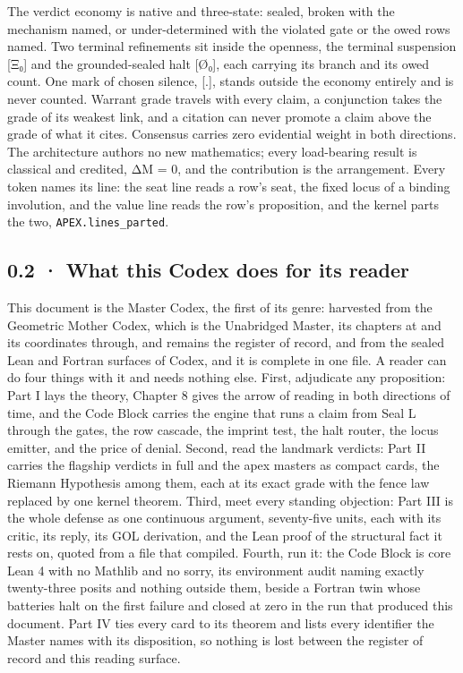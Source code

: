 \documentclass[10pt,twocolumn]{article}
\begin{document}
The verdict economy is native and three-state: sealed, broken with the
mechanism named, or under-determined with the violated gate or the owed
rows named. Two terminal refinements sit inside the openness, the
terminal suspension {[}Ξ₀{]} and the grounded-sealed halt {[}Ø₀{]}, each
carrying its branch and its owed count. One mark of chosen silence,
{[}.{]}, stands outside the economy entirely and is never counted.
Warrant grade travels with every claim, a conjunction takes the grade of
its weakest link, and a citation can never promote a claim above the
grade of what it cites. Consensus carries zero evidential weight in both
directions. The architecture authors no new mathematics; every
load-bearing result is classical and credited, ΔM = 0, and the
contribution is the arrangement. Every token names its line: the seat
line reads a row's seat, the fixed locus of a binding involution, and
the value line reads the row's proposition, and the kernel parts the
two, \texttt{APEX.lines\_parted}.

\hypertarget{what-this-codex-does-for-its-reader}{%
\subsection{0.2 · What this Codex does for its
reader}\label{what-this-codex-does-for-its-reader}}

This document is the Master Codex, the first of its genre: harvested
from the Geometric Mother Codex, which is the Unabridged Master, its
chapters at and its coordinates through, and remains the register of
record, and from the sealed Lean and Fortran surfaces of Codex, and it
is complete in one file. A reader can do four things with it and needs
nothing else. First, adjudicate any proposition: Part I lays the theory,
Chapter 8 gives the arrow of reading in both directions of time, and the
Code Block carries the engine that runs a claim from Seal L through the
gates, the row cascade, the imprint test, the halt router, the locus
emitter, and the price of denial. Second, read the landmark verdicts:
Part II carries the flagship verdicts in full and the apex masters as
compact cards, the Riemann Hypothesis among them, each at its exact
grade with the fence law replaced by one kernel theorem. Third, meet
every standing objection: Part III is the whole defense as one
continuous argument, seventy-five units, each with its critic, its
reply, its GOL derivation, and the Lean proof of the structural fact it
rests on, quoted from a file that compiled. Fourth, run it: the Code
Block is core Lean 4 with no Mathlib and no sorry, its environment audit
naming exactly twenty-three posits and nothing outside them, beside a
Fortran twin whose batteries halt on the first failure and closed at
zero in the run that produced this document. Part IV ties every card to
its theorem and lists every identifier the Master names with its
disposition, so nothing is lost between the register of record and this
reading surface.
\end{document}
